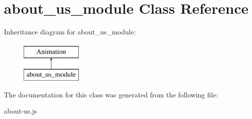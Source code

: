 \hypertarget{classabout__us__module}{\section{about\-\_\-us\-\_\-module Class Reference}
\label{classabout__us__module}
}
Inheritance diagram for about\-\_\-us\-\_\-module\-:\begin{figure}[H]
\begin{center}
\leavevmode
\includegraphics[height=2.000000cm]{classabout__us__module}
\end{center}
\end{figure}


The documentation for this class was generated from the following file\-:\begin{DoxyCompactItemize}
\item 
about-\/us.\-js\end{DoxyCompactItemize}
